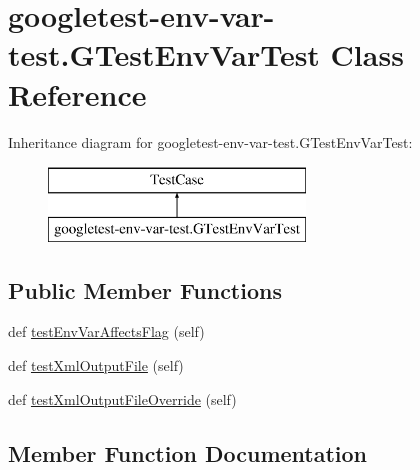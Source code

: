 \hypertarget{classgoogletest-env-var-test_1_1_g_test_env_var_test}{}\section{googletest-\/env-\/var-\/test.G\+Test\+Env\+Var\+Test Class Reference}
\label{classgoogletest-env-var-test_1_1_g_test_env_var_test}
Inheritance diagram for googletest-\/env-\/var-\/test.G\+Test\+Env\+Var\+Test\+:\begin{figure}[H]
\begin{center}
\leavevmode
\includegraphics[height=2.000000cm]{classgoogletest-env-var-test_1_1_g_test_env_var_test}
\end{center}
\end{figure}
\subsection*{Public Member Functions}
\begin{DoxyCompactItemize}
\item 
def \mbox{\hyperlink{classgoogletest-env-var-test_1_1_g_test_env_var_test_ae0165e3c30ce525c4d2f653e8f27ed3c}{test\+Env\+Var\+Affects\+Flag}} (self)
\item 
def \mbox{\hyperlink{classgoogletest-env-var-test_1_1_g_test_env_var_test_a6929a9194cdf872c02f6b2f3de9ff499}{test\+Xml\+Output\+File}} (self)
\item 
def \mbox{\hyperlink{classgoogletest-env-var-test_1_1_g_test_env_var_test_acf4114bec10759f9545f16846ce17f6f}{test\+Xml\+Output\+File\+Override}} (self)
\end{DoxyCompactItemize}


\subsection{Member Function Documentation}
\mbox{\label{classgoogletest-env-var-test_1_1_g_test_env_var_test_ae0165e3c30ce525c4d2f653e8f27ed3c}} 
